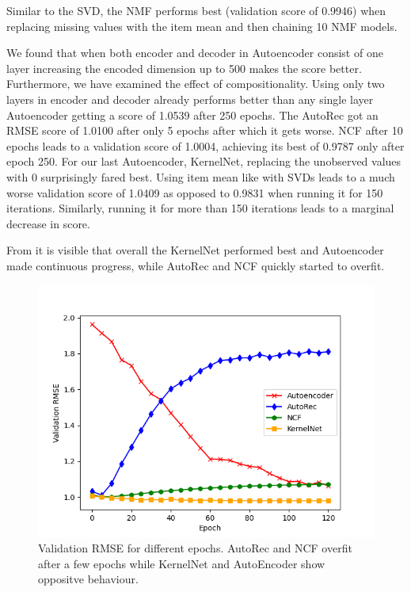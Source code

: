\documentclass[10pt,conference,compsocconf]{IEEEtran}
\begin{document}
    Similar to the SVD, the NMF performs best (validation score of 0.9946) when replacing missing values with the item mean and then chaining 10 NMF models.

    We found that when both encoder and decoder in Autoencoder consist of one layer increasing the encoded dimension up to 500 makes
    the score better.
    Furthermore, we have examined the effect of compositionality.
    Using only two layers in encoder and decoder already performs better than any single layer Autoencoder getting a score of 1.0539 after 250 epochs.
    The AutoRec got an RMSE score of 1.0100 after only 5 epochs after which it gets worse.
    NCF after 10 epochs leads to a validation score of 1.0004, achieving its best of 0.9787 only after epoch 250.
    For our last Autoencoder, KernelNet, replacing the unobserved values with 0 surprisingly fared best.
    Using item mean like with SVDs leads to a much worse validation score of 1.0409 as opposed to 0.9831 when running it for 150 iterations.
    Similarly, running it for more than 150 iterations leads to a marginal decrease in score.

    From   it is visible that overall the KernelNet performed best and Autoencoder made continuous progress, while AutoRec and NCF quickly started to overfit.

    \begin{figure}
        \includegraphics[width=\columnwidth]{figures/validation_plot.png}
        \caption{Validation RMSE for different epochs.
        AutoRec and NCF overfit after a few epochs while KernelNet and AutoEncoder show oppositve behaviour.}
        \label{fig:validation}
    \end{figure}
\end{document}
